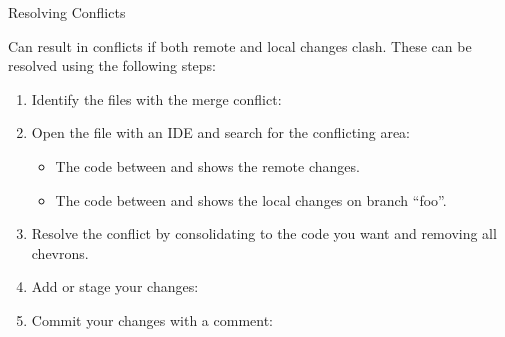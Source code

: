 \documentclass{setbeamer}
\begin{document}
\begin{frame}{Resolving Conflicts}

    \begin{Center}
         {\Large\MVRightarrow{}}  {\Large\MVRightarrow{}}  {\Large\MVRightarrow{}} 
    \end{Center}
    
	Can result in conflicts if both remote and local changes clash. These can be resolved using the following steps:

	\begin{enumerate}
	\item Identify the files with the merge conflict: 
	\item Open the file with an IDE and search for the conflicting area:
	\begin{itemize}
	\item The code between  and  shows the remote changes.
	\item The code between  and  shows the local changes on branch ``foo''.
	\end{itemize}    
	\item Resolve the conflict by consolidating to the code you want and removing all chevrons.
	\item Add or stage your changes: 
	\item Commit your changes with a comment: 
	\end{enumerate}

\end{frame}
\end{document}
